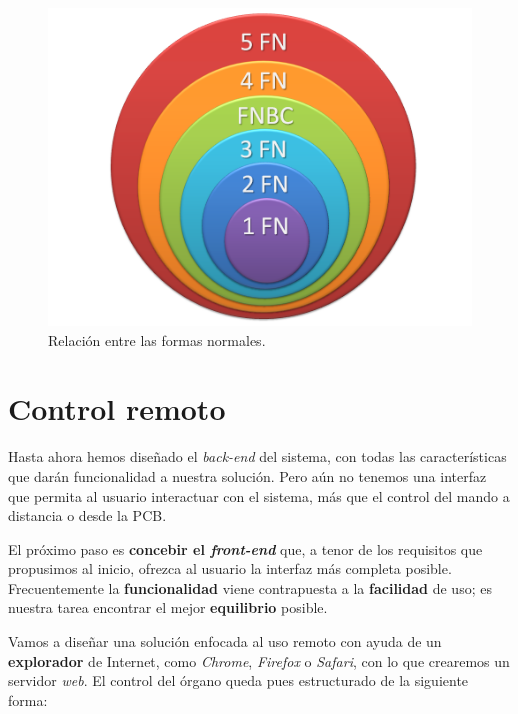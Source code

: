 \begin{figure}[H]
	\noindent \begin{centering}
		\includegraphics[width=\linewidth/2]{capitulo4/bd_fn}
		\par\end{centering}
	\smallskip
	\caption[Relación entre las formas normales.]{\label{fig:bd_fn} Relación entre las formas normales. \cite{wiki_normal}}
\end{figure} 

\smallskip

\newpage

\section{Control remoto}

Hasta ahora hemos diseñado el \textit{back-end} del sistema, con todas las características que darán funcionalidad a nuestra solución. Pero aún no tenemos una interfaz que permita al usuario interactuar con el sistema, más que el control del mando a distancia o desde la \acrshort{PCB}.

El próximo paso es \textbf{concebir el \textit{front-end}} que, a tenor de los requisitos que propusimos al inicio, ofrezca al usuario la interfaz más completa posible. Frecuentemente la \textbf{funcionalidad} viene contrapuesta a la \textbf{facilidad} de uso; es nuestra tarea encontrar el mejor \textbf{equilibrio} posible.

Vamos a diseñar una solución enfocada al uso remoto con ayuda de un \textbf{explorador} de Internet, como \textit{Chrome}, \textit{Firefox} o \textit{Safari}, con lo que crearemos un servidor \textit{web}. El control del órgano queda pues estructurado de la siguiente forma:

